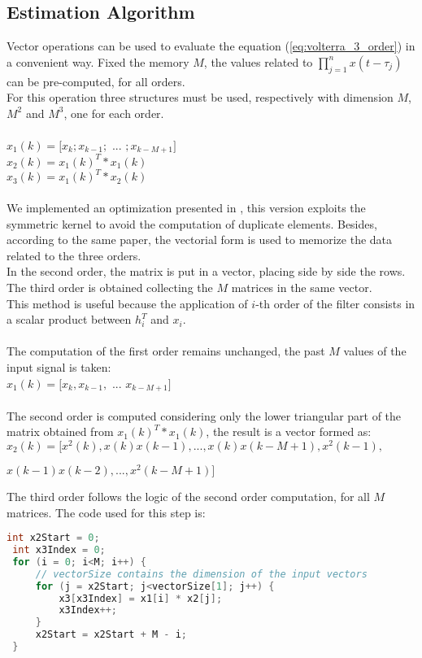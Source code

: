\subsection{Estimation Algorithm}
Vector operations can be used to evaluate the equation (\ref{eq:volterra_3_order}) in a convenient way. Fixed the memory $M$, the values related to $\prod_{j=1}^n x(t-\tau_j)$ can be pre-computed, for all orders.\\
For this operation three structures must be used, respectively with dimension $M$, $M^2$ and $M^3$, one for each order.\\\\
$x_1(k) = [ x_k; x_{k-1}; $ ... $; x_{k-M+1} ] $\\
$x_2(k) = x_1(k)^{T} * x_1(k)$\\
$x_3(k) = x_1(k)^{T} * x_2(k)$ \\\\
We implemented an optimization presented in \cite{lmsestimation}, this version exploits the symmetric kernel to avoid the computation of duplicate elements.
Besides, according to the same paper, the vectorial form is used to memorize the data related to the three orders.\\ 
In the second order, the matrix is put in a vector, placing side by side the rows. The third order is obtained collecting the $M$ matrices in the same vector.\\
This method is useful because the application of $i$-th order of the filter consists in a scalar product between $h_i^T$ and $x_i$.\\\\
The computation of the first order remains unchanged, the past $M$ values of the input signal is taken:\\
$x_1(k) = [ x_k, x_{k-1}, $ ... $ x_{k-M+1} ] $\\\\
The second order is computed considering only the lower triangular part of the matrix obtained from $x_1(k)^{T} * x_1(k)$, the result is a vector formed as:\\
$x_2(k) = [x^2(k), x(k)x(k-1),..., x(k)x(k-M+1),x^2(k-1),$
\begin{flushright}
$ x(k-1)x(k-2),..., x^2(k-M+1)]$\\
\end{flushright}
The third order follows the logic of the second order computation, for all $M$ matrices. The code used for this step is:\\
\begin{center}
\begin{minipage}{\linewidth}
\begin{lstlisting}[language=C++]
 int x2Start = 0;
 int x3Index = 0;
 for (i = 0; i<M; i++) {
	 // vectorSize contains the dimension of the input vectors
	 for (j = x2Start; j<vectorSize[1]; j++) {
		 x3[x3Index] = x1[i] * x2[j];
		 x3Index++;
	 }
	 x2Start = x2Start + M - i;
 }
\end{lstlisting}
\end{minipage}
\end{center}
